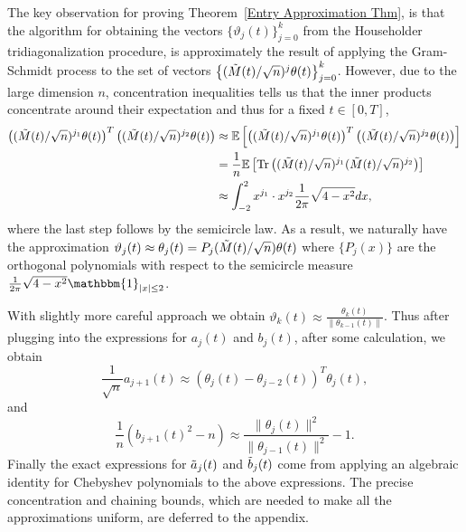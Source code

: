 \documentclass{amsart}
\numberwithin{equation}{section}
\newcommand{\E}{\mathbb{E}}
\begin{document}
The key observation for proving Theorem~\ref{Entry Approximation Thm}, is that the algorithm for obtaining the vectors $\{\vartheta_j(t)\}_{j=0}^{k}$ from the Householder tridiagonalization procedure, is approximately the result of applying the Gram-Schmidt process to the set of vectors $\left\{(\Tilde{M}(t)/\sqrt{n})^j \theta(t)\right\}_{j=0}^{k}$. However, due to the large dimension $n$, concentration inequalities tells us that the inner products concentrate around their expectation and thus for a fixed $t \in [0,T]$,
\begin{equation*}
    \begin{split}
        \left((\Tilde{M}(t)/\sqrt{n})^{j_1} \theta(t)\right)^T\left((\Tilde{M}(t)/\sqrt{n})^{j_2} \theta(t)\right) &\approx \E\left[\left((\Tilde{M}(t)/\sqrt{n})^{j_1} \theta(t)\right)^T\left((\Tilde{M}(t)/\sqrt{n})^{j_2} \theta(t)\right)\right]\\
        & = \frac{1}{n}\E\left[\mathrm{Tr}\left((\Tilde{M}(t)/\sqrt{n})^{j_1}(\Tilde{M}(t)/\sqrt{n})^{j_2}\right)\right]\\
        &\approx \int_{-2}^{2} x^{j_1} \cdot x^{j_2} \frac{1}{2\pi}\sqrt{4-x^2} dx,
    \end{split}
\end{equation*}
where the last step follows by the semicircle law. As a result, we naturally have the approximation $\vartheta_j(t) \approx \theta_j(t) = P_j(\Tilde{M}(t)/\sqrt{n})\theta(t)$ where $\{P_j(x)\}$ are the orthogonal polynomials with respect to the semicircle measure $\frac{1}{2\pi}\sqrt{4-x^2} \mathbbm{1}_{|x|\leq 2}$.

With slightly more careful approach we obtain $\vartheta_k(t) \approx \frac{\theta_k(t)}{\|\theta_{k-1}(t)\|}$. Thus after plugging into the expressions for $a_j(t)$ and $b_j(t)$, after some calculation, we obtain 
\begin{equation*}
    \frac{1}{\sqrt{n}}a_{j+1}(t) \approx (\theta_{j}(t)-\theta_{j-2}(t))^T\theta_j(t),
\end{equation*}
and
\begin{equation*}
    \frac{1}{n}(b_{j+1}(t)^2-n) \approx \frac{\|\theta_j(t)\|^2}{\|\theta_{j-1}(t)\|^2}-1.
\end{equation*}
Finally the exact expressions for $\Tilde{a}_j(t)$ and $\Tilde{b}_j(t)$ come from applying an algebraic identity for Chebyshev polynomials to the above expressions. The precise concentration and chaining bounds, which are needed to make all the approximations uniform, are deferred to the appendix.
\end{document}

